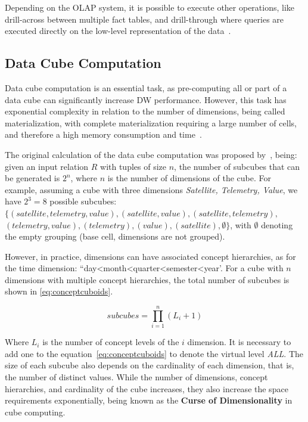 Depending on the OLAP system, it is possible to execute other operations, like drill-across between multiple fact tables, and drill-through where queries are executed directly on the low-level representation of the data~\cite{hanDataMiningConcepts2011}.

\subsection{Data Cube Computation}\label{ch:fun:cube:comp}

Data cube computation is an essential task, as pre-computing all or part of a data cube can significantly increase DW performance.
However, this task has exponential complexity in relation to the number of dimensions, being called materialization, with complete materialization requiring a large number of cells, and therefore a high memory consumption and time~\cite{hanDataMiningConcepts2011}.

The original calculation of the data cube computation was proposed by~\cite{grayDataCubeRelational1996}, being: given an input relation $R$ with tuples of size $n$, the number of subcubes that can be generated is $2^n$, where $n$ is the number of dimensions of the cube.
For example, assuming a cube with three dimensions \textit{Satellite, Telemetry, Value}, we have $2^3 = 8$ possible subcubes: $\{(satellite, telemetry, value), (satellite, value), (satellite, telemetry),$ $(telemetry, value), (telemetry), (value), (satellite), \emptyset \}$, with $\emptyset$ denoting the empty grouping (base cell, dimensions are not grouped).

However, in practice, dimensions can have associated concept hierarchies, as for the time dimension: ``day<month<quarter<semester<year'.
For a cube with $n$ dimensions with multiple concept hierarchies, the total number of subcubes is shown in \autoref{eq:conceptcuboids}.

\begin{equation}
  subcubes = \prod_{i=1}^n (L_i + 1)
\label{eq:conceptcuboids}
\end{equation}

Where $L_i$ is the number of concept levels of the $i$ dimension.
It is necessary to add one to the equation~\ref{eq:conceptcuboids} to denote the virtual level \textit{ALL}.
The size of each subcube also depends on the cardinality of each dimension, that is, the number of distinct values.
While the number of dimensions, concept hierarchies, and cardinality of the cube increases, they also increase the space requirements exponentially, being known as the \textbf{Curse of Dimensionality} in cube computing.


